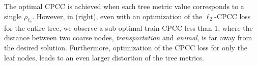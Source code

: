 The optimal CPCC is achieved when each tree metric value corresponds to a single $\rho_{\ell_2}$. However, in  (right), even with an optimization of the $\ell_2$-CPCC loss for the entire tree, we observe a sub-optimal train CPCC less than $1$, where the distance between two coarse nodes, \emph{transportation} and \emph{animal}, is far away from the desired solution. Furthermore, optimization of the CPCC loss for only the leaf nodes, leads to an even larger distortion of the tree metrics. 

